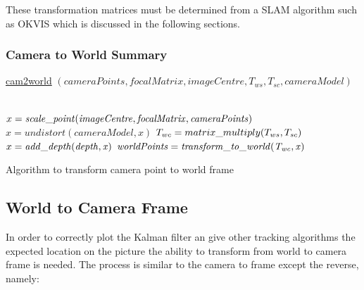 \documentclass[11pt,twoside]{report}
\begin{document}
These transformation matrices must be determined from a SLAM algorithm such as OKVIS which is discussed in the following sections.

\subsubsection{Camera to World Summary}

\begin{algorithm}
	\DontPrintSemicolon
	\SetAlgoLined
	\underline{cam2world} $(cameraPoints,focalMatrix,imageCentre,T_{ws},T_{sc},cameraModel)$\;
	
	\texttt{\\}
	$x = \mathit{scale\text{\textunderscore}point(imageCentre,focalMatrix,cameraPoints)}$ 
	$x = \mathit{undistort(cameraModel,x)}$ 
	$T_{wc} = matrix\text{\textunderscore}multiply(T_{ws},T_{sc})$
	\texttt{\\}
	$x = \mathit{add\text{\textunderscore}depth(depth,x)}$ 
	$\mathit{worldPoints} = \mathit{transform\text{\textunderscore}to\text{\textunderscore}world(T_{wc},x)}$ 
	\texttt{\\}
	\caption{Algorithm to transform camera point to world frame}
	\label{alg:weights}
\end{algorithm}

\subsection{World to Camera Frame} \label{w_c_frame}

In order to correctly plot the Kalman filter an give other tracking algorithms the expected location on the picture the ability to transform from world to camera frame is needed. The process is similar to the camera to frame except the reverse, namely:
\end{document}

